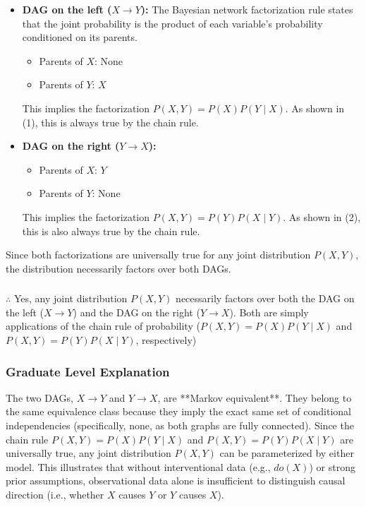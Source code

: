 \documentclass{article}
\begin{document}
\begin{itemize}
    \item \textbf{DAG on the left ($X \to Y$):} The Bayesian network factorization rule states that the joint probability is the product of each variable's probability conditioned on its parents.
        \begin{itemize}
            \item Parents of $X$: None
            \item Parents of $Y$: $X$
        \end{itemize}
        This implies the factorization $P(X, Y) = P(X) P(Y \mid X)$. As shown in (1), this is always true by the chain rule.
        
    \item \textbf{DAG on the right ($Y \to X$):}
        \begin{itemize}
            \item Parents of $X$: $Y$
            \item Parents of $Y$: None
        \end{itemize}
        This implies the factorization $P(X, Y) = P(Y) P(X \mid Y)$. As shown in (2), this is also always true by the chain rule.
\end{itemize}
Since both factorizations are universally true for any joint distribution $P(X, Y)$, the distribution necessarily factors over both DAGs.

\subsubsection*{\normalfont}{$\therefore$ Yes, any joint distribution $P(X, Y)$ necessarily factors over both the DAG on the left ($X \to Y$) and the DAG on the right ($Y \to X$). Both are simply applications of the chain rule of probability ($P(X,Y) = P(X)P(Y \mid X)$ and $P(X,Y) = P(Y)P(X \mid Y)$, respectively)}

\subsubsection*{Graduate Level Explanation}
The two DAGs, $X \to Y$ and $Y \to X$, are **Markov equivalent**.  They belong to the same equivalence class because they imply the exact same set of conditional independencies (specifically, none, as both graphs are fully connected). Since the chain rule $P(X,Y) = P(X)P(Y \mid X)$ and $P(X,Y) = P(Y)P(X \mid Y)$ are universally true, any joint distribution $P(X,Y)$ can be parameterized by either model. This illustrates that without interventional data (e.g., $do(X)$) or strong prior assumptions, observational data alone is insufficient to distinguish causal direction (i.e., whether $X$ causes $Y$ or $Y$ causes $X$).
\end{document}
